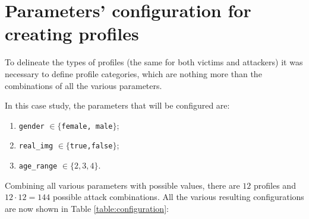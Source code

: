 \section{Parameters' configuration for creating profiles}
\label{cap:table-configuration}
To delineate the types of profiles (the same for both victims and attackers) it was necessary to define profile categories, which are nothing more than the combinations of all the various parameters.\par \noindent 
In this case study, the parameters that will be configured are:
\begin{enumerate}
	\item \texttt{gender} $ \in \{$\texttt{female, male}$\}$;
	\item \texttt{real\_img} $ \in \{$\texttt{true,false}$\}$;
	\item \texttt{age\_range} $ \in \{2,3,4\}$.
\end{enumerate}
Combining all various parameters with possible values, there are $12$ profiles and $12 \cdot 12 = 144$ possible attack combinations. All the various resulting configurations are now shown in Table \ref{table:configuration}:
